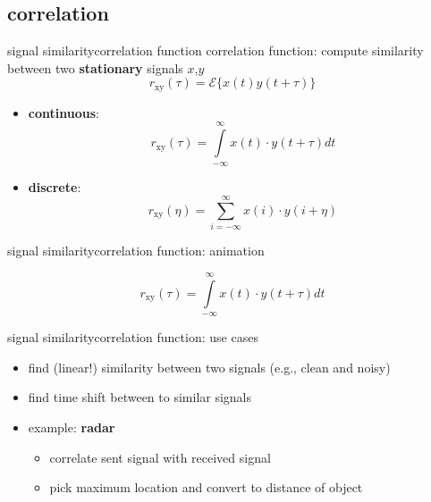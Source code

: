         \subsection{correlation}

\begin{frame}{signal similarity}{correlation function}
	correlation function: compute similarity between two \textbf{stationary} signals $x$,$y$
    \begin{equation}
        r_\mathrm{xy}(\tau)=\mathcal{E}\lbrace x(t)y(t+\tau)\rbrace  
    \end{equation}  
	\pause
    
	\begin{itemize}
		\item	\textbf{continuous}:
            \begin{equation}
                r_\mathrm{xy}(\tau) = \int\limits_{-\infty}^{\infty}{x(t)\cdot y(t+\tau)dt}
            \end{equation}
		\item	\textbf{discrete}:
            \begin{equation}
                r_\mathrm{xy}(\eta) = \sum\limits_{i=-\infty}^{\infty}{x(i)\cdot y(i+\eta)}
            \end{equation}
	\end{itemize}
\end{frame}

\begin{frame}{signal similarity}{correlation function: animation}
    \vspace{-5mm}
    \begin{footnotesize}
    \begin{equation}
        r_\mathrm{xy}(\tau) = \int\limits_{-\infty}^{\infty}{x(t)\cdot y(t+\tau)}dt
    \end{equation}
    \end{footnotesize}
\end{frame}

\begin{frame}{signal similarity}{correlation function: use cases}
    \begin{itemize}
        \item   find (linear!) similarity between two signals (e.g., clean and noisy)
        \item   find time shift between to similar signals
        \pause
        \bigskip
        \item   example: \textbf{radar}
            \begin{itemize}
                \item   correlate sent signal with received signal
                \item   pick maximum location and convert to distance of object
            \end{itemize}
    \end{itemize}
\end{frame}

